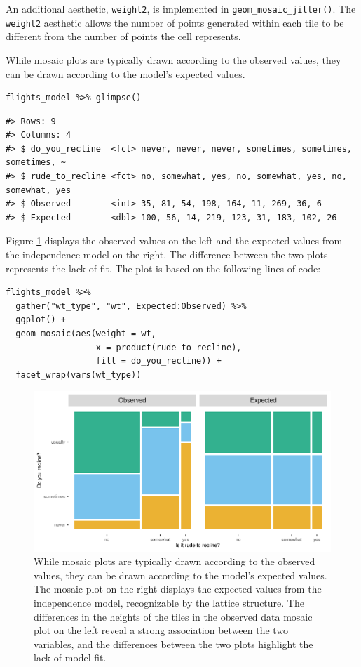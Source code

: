 An additional aesthetic, \texttt{weight2}, is implemented in \texttt{geom\_mosaic\_jitter()}. The \texttt{weight2} aesthetic allows the number of points generated within each tile to be different from the number of points the cell represents.

While mosaic plots are typically drawn according to the observed values, they can be drawn according to the model's expected values.

\begin{verbatim}
flights_model %>% glimpse()
\end{verbatim}

\begin{verbatim}
#> Rows: 9
#> Columns: 4
#> $ do_you_recline  <fct> never, never, never, sometimes, sometimes, sometimes, ~
#> $ rude_to_recline <fct> no, somewhat, yes, no, somewhat, yes, no, somewhat, yes
#> $ Observed        <int> 35, 81, 54, 198, 164, 11, 269, 36, 6
#> $ Expected        <dbl> 100, 56, 14, 219, 123, 31, 183, 102, 26
\end{verbatim}

Figure \ref{fig:model} displays the observed values on the left and the expected values from the independence model on the right. The difference between the two plots represents the lack of fit. The plot is based on the following lines of code:

\begin{verbatim}
flights_model %>% 
  gather("wt_type", "wt", Expected:Observed) %>% 
  ggplot() + 
  geom_mosaic(aes(weight = wt, 
                  x = product(rude_to_recline), 
                  fill = do_you_recline)) +
  facet_wrap(vars(wt_type))
\end{verbatim}

\begin{figure}[h]

{\centering \includegraphics[width=1\linewidth]{RJ-2023-013_files/figure-latex/model-1} 

}

\caption{While mosaic plots are typically drawn according to the observed values, they can be drawn according to the model's expected values. The mosaic plot on the right displays the expected values from the independence model, recognizable by the lattice structure. The differences in the heights of the tiles in the observed data mosaic plot on the left reveal a strong association between the two variables, and the differences between the two plots highlight the lack of model fit.}\label{fig:model}
\end{figure}

